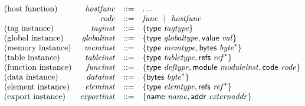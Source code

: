 $$
\begin{array}[t]{@{}lrrl@{}l@{}}
\mbox{(host function)} & {\mathit{hostfunc}} & ::= & \ldots \\
& {\mathit{code}} & ::= & {\mathit{func}} ~~|~~ {\mathit{hostfunc}} \\
\mbox{(tag instance)} & {\mathit{taginst}} & ::= & \{ \begin{array}[t]{@{}l@{}l@{}}
\mathsf{type}~{\mathit{tagtype}} \} \\
\end{array} \\
\mbox{(global instance)} & {\mathit{globalinst}} & ::= & \{ \begin{array}[t]{@{}l@{}l@{}}
\mathsf{type}~{\mathit{globaltype}} ,  \mathsf{value}~{\mathit{val}} \} \\
\end{array} \\
\mbox{(memory instance)} & {\mathit{meminst}} & ::= & \{ \begin{array}[t]{@{}l@{}l@{}}
\mathsf{type}~{\mathit{memtype}} ,  \mathsf{bytes}~{{\mathit{byte}}^\ast} \} \\
\end{array} \\
\mbox{(table instance)} & {\mathit{tableinst}} & ::= & \{ \begin{array}[t]{@{}l@{}l@{}}
\mathsf{type}~{\mathit{tabletype}} ,  \mathsf{refs}~{{\mathit{ref}}^\ast} \} \\
\end{array} \\
\mbox{(function instance)} & {\mathit{funcinst}} & ::= & \{ \begin{array}[t]{@{}l@{}l@{}}
\mathsf{type}~{\mathit{deftype}} ,  \mathsf{module}~{\mathit{moduleinst}} ,  \mathsf{code}~{\mathit{code}} \} \\
\end{array} \\
\mbox{(data instance)} & {\mathit{datainst}} & ::= & \{ \begin{array}[t]{@{}l@{}l@{}}
\mathsf{bytes}~{{\mathit{byte}}^\ast} \} \\
\end{array} \\
\mbox{(element instance)} & {\mathit{eleminst}} & ::= & \{ \begin{array}[t]{@{}l@{}l@{}}
\mathsf{type}~{\mathit{elemtype}} ,  \mathsf{refs}~{{\mathit{ref}}^\ast} \} \\
\end{array} \\
\mbox{(export instance)} & {\mathit{exportinst}} & ::= & \{ \begin{array}[t]{@{}l@{}l@{}}
\mathsf{name}~{\mathit{name}} ,  \mathsf{addr}~{\mathit{externaddr}} \} \\
\end{array} \\
\end{array}
$$

